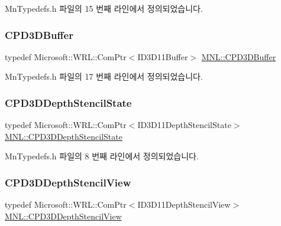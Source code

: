 Mn\+Typedefs.\+h 파일의 15 번째 라인에서 정의되었습니다.

\mbox{\label{namespace_m_n_l_aab9c90a8c27ac6410a9cc7cd89efeef1}} 
\subsubsection{\texorpdfstring{C\+P\+D3\+D\+Buffer}{CPD3DBuffer}}
{\footnotesize\ttfamily typedef Microsoft\+::\+W\+R\+L\+::\+Com\+Ptr$<$I\+D3\+D11\+Buffer$>$ \hyperlink{namespace_m_n_l_aab9c90a8c27ac6410a9cc7cd89efeef1}{M\+N\+L\+::\+C\+P\+D3\+D\+Buffer}}



Mn\+Typedefs.\+h 파일의 17 번째 라인에서 정의되었습니다.

\mbox{\label{namespace_m_n_l_a8209b06065c025e5d6bc2e8ee5925faf}} 
\subsubsection{\texorpdfstring{C\+P\+D3\+D\+Depth\+Stencil\+State}{CPD3DDepthStencilState}}
{\footnotesize\ttfamily typedef Microsoft\+::\+W\+R\+L\+::\+Com\+Ptr$<$I\+D3\+D11\+Depth\+Stencil\+State$>$ \hyperlink{namespace_m_n_l_a8209b06065c025e5d6bc2e8ee5925faf}{M\+N\+L\+::\+C\+P\+D3\+D\+Depth\+Stencil\+State}}



Mn\+Typedefs.\+h 파일의 8 번째 라인에서 정의되었습니다.

\mbox{\label{namespace_m_n_l_a12b3c209d76ede855300e637f4192a04}} 
\subsubsection{\texorpdfstring{C\+P\+D3\+D\+Depth\+Stencil\+View}{CPD3DDepthStencilView}}
{\footnotesize\ttfamily typedef Microsoft\+::\+W\+R\+L\+::\+Com\+Ptr$<$I\+D3\+D11\+Depth\+Stencil\+View$>$ \hyperlink{namespace_m_n_l_a12b3c209d76ede855300e637f4192a04}{M\+N\+L\+::\+C\+P\+D3\+D\+Depth\+Stencil\+View}}



